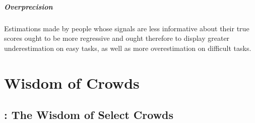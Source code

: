 \documentclass[11pt]{elegantbook}
\begin{document}
\paragraph*{Overprecision}
Estimations made by people whose signals are less informative about their true scores ought to be more regressive and ought therefore to display greater underestimation on easy tasks, as well as more overestimation on difficult tasks.



\chapter{Wisdom of Crowds}
\section{\cite{mannes2014wisdom}: The Wisdom of Select Crowds}


































\end{document}
